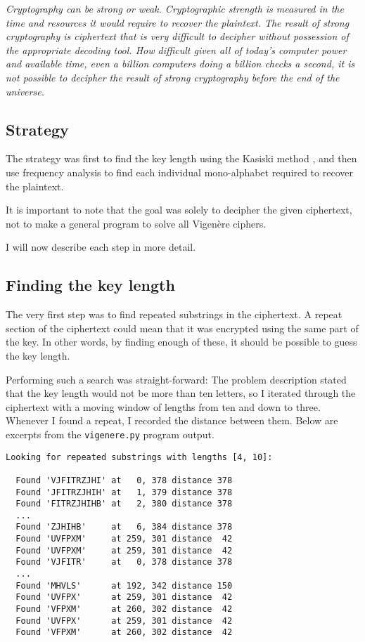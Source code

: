 \documentclass[a4paper,english,12pt]{article}
\begin{document}
\textit{Cryptography can be strong or weak. Cryptographic strength is measured
in the time and resources it would require to recover the plaintext.  The
result of strong cryptography is ciphertext that is very difficult to decipher
without possession of the appropriate decoding tool. How difficult given all of
today's computer power and available time, even a billion computers doing a
billion checks a second, it is not possible to decipher the result of strong
cryptography before the end of the universe.}

\subsection{Strategy}

The strategy was first to find the key length using the Kasiski method
\cite{dalkilic2000interactive, wiki:kasiski.examination}, and then use
frequency analysis to find each individual mono-alphabet required to recover
the plaintext.

It is important to note that the goal was solely to decipher the given
ciphertext, not to make a general program to solve all Vigenère ciphers.

I will now describe each step in more detail.

\subsection{Finding the key length}

The very first step was to find repeated substrings in the ciphertext. A repeat
section of the ciphertext could mean that it was encrypted using the same part
of the key. In other words, by finding enough of these, it should be possible
to guess the key length.

Performing such a search was straight-forward: The problem description stated
that the key length would not be more than ten letters, so I iterated through
the ciphertext with a moving window of lengths from ten and down to three.
Whenever I found a repeat, I recorded the distance between them. Below are
excerpts from the \texttt{vigenere.py} program output.

\begin{verbatim}
Looking for repeated substrings with lengths [4, 10]:

  Found 'VJFITRZJHI' at   0, 378 distance 378
  Found 'JFITRZJHIH' at   1, 379 distance 378
  Found 'FITRZJHIHB' at   2, 380 distance 378
  ...
  Found 'ZJHIHB'     at   6, 384 distance 378
  Found 'UVFPXM'     at 259, 301 distance  42
  Found 'UVFPXM'     at 259, 301 distance  42
  Found 'VJFITR'     at   0, 378 distance 378
  ...
  Found 'MHVLS'      at 192, 342 distance 150
  Found 'UVFPX'      at 259, 301 distance  42
  Found 'VFPXM'      at 260, 302 distance  42
  Found 'UVFPX'      at 259, 301 distance  42
  Found 'VFPXM'      at 260, 302 distance  42
\end{verbatim}
\end{document}
